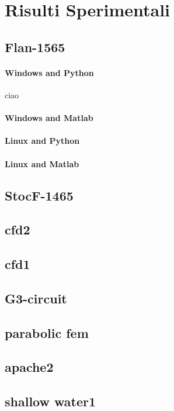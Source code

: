 \documentclass[11pt]{article}
\begin{document}


\section{Risulti Sperimentali}
\subsection{Flan-1565}
\paragraph{Windows and Python}
ciao
\paragraph{Windows and Matlab}

\paragraph{Linux and Python}
\paragraph{Linux and Matlab}

\subsection{StocF-1465}
\subsection{cfd2}
\subsection{cfd1}
\subsection{G3-circuit}
\subsection{parabolic fem} 
\subsection{apache2}
\subsection{shallow water1}
\end{document}
